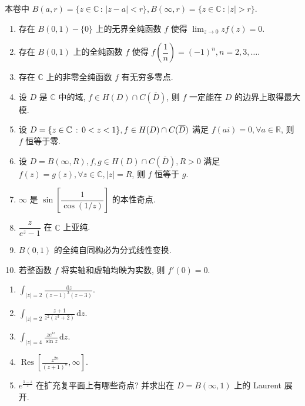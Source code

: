 \documentclass[simple]{hfutexam}
\newcommand{\BC}{\mathbb{C}}
\newcommand{\BR}{\mathbb{R}}
\newcommand{\ra}{\rightarrow}
\let\Re\relax
\DeclareMathOperator\Re{Re}
\DeclareMathOperator\Res{Res}
\newcommand{\diff}{\, \mathrm{d}}
\renewcommand{\mid}{\,:\,}
\begin{document}
\maketitle

\begin{center}
本卷中 $B(a, r)=\{z\in\BC\mid|z-a|<r\}, B(\infty, r)=\{z\in\BC\mid|z|>r\}$.
\end{center}


\begin{enumerate}
\item 存在 $B(0, 1)-\{0\}$ 上的无界全纯函数 $f$ 使得 $\displaystyle\lim_{z\ra 0}zf(z)=0$.
\item 存在 $B(0, 1)$ 上的全纯函数 $f$ 使得 $f\left(\dfrac1n\right)=(-1)^n, n=2, 3, \dots$.
\item 存在 $\BC$ 上的非零全纯函数 $f$ 有无穷多零点.
\item 设 $D$ 是 $\BC$ 中的域, $f\in H(D)\cap C(\overline D)$, 则 $f$ 一定能在 $D$ 的边界上取得最大模.
\item 设 $D=\{z\in\BC\mid0<\Re z<1\}, f\in H(D)\cap C(\overline D)$ 满足 $f(ai)=0, \forall a\in\BR$, 则 $f$ 恒等于零.
\item 设 $D=B(\infty, R), f, g\in H(D)\cap C(\overline D), R>0$ 满足 $f(z)=g(z), \forall z\in\BC, |z|=R$, 则 $f$ 恒等于 $g$.
\item $\infty$ 是 $\sin\left[\dfrac1{\cos(1/z)}\right]$ 的本性奇点.
\item $\dfrac{z}{e^z-1}$ 在 $\BC$ 上亚纯.
\item $B(0, 1)$ 的全纯自同构必为分式线性变换.
\item 若整函数 $f$ 将实轴和虚轴均映为实数, 则 $f'(0)=0$.
\end{enumerate}


\begin{enumerate}
\item $\displaystyle\int_{|z|=2}\frac{\diff z}{(z-1)^3(z-3)}$.
\item $\displaystyle\int_{|z|=2}\frac{z+1}{z^2(z^3+2)}\diff z$.
\item $\displaystyle\int_{|z|=4}\frac{ze^{iz}}{\sin z}\diff z$.
\item $\displaystyle\Res\left[\frac{z^{2n}}{(z+1)^n}, \infty\right]$.
\item $e^{\frac{1-z}{z}}$ 在扩充复平面上有哪些奇点? 并求出在 $D=B(\infty, 1)$ 上的 Laurent 展开.
\end{enumerate}
\end{document}
